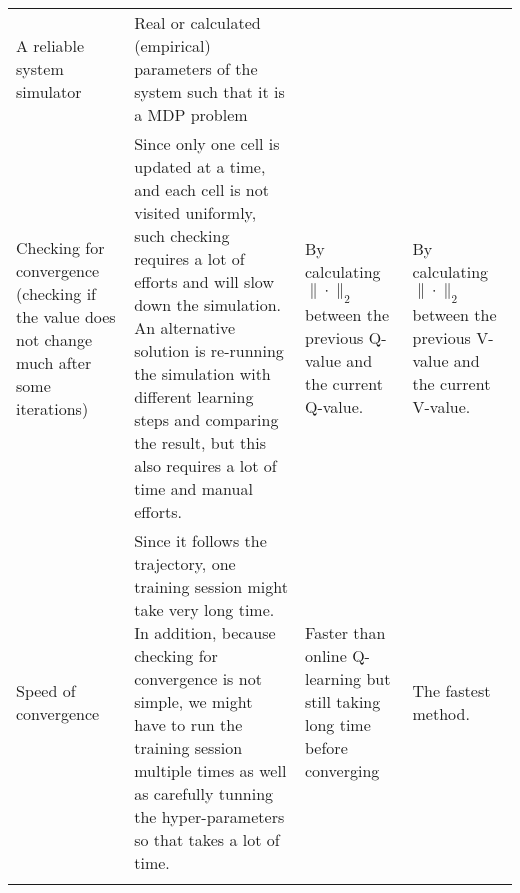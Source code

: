 \documentclass[
  a4paper, xcolor = usenames,dvipsnames]{article}
\theoremstyle{definition}
\theoremstyle{definition}
\theoremstyle{definition}
\theoremstyle{definition}
\theoremstyle{remark}
\begin{document}
\begin{longtable}[]{@{}llll@{}}
\begin{minipage}[t]{0.18\columnwidth}
A reliable system simulator\strut
\end{minipage} & \begin{minipage}[t]{0.18\columnwidth}\raggedright
Real or calculated (empirical) parameters of the system such that it is a MDP problem\strut
\end{minipage}\tabularnewline
\begin{minipage}[t]{0.18\columnwidth}\raggedright
Checking for convergence (checking if the value does not change much after some iterations)\strut
\end{minipage} & \begin{minipage}[t]{0.35\columnwidth}\raggedright
Since only one cell is updated at a time, and each cell is not visited uniformly, such checking requires a lot of efforts and will slow down the simulation. An alternative solution is re-running the simulation with different learning steps and comparing the result, but this also requires a lot of time and manual efforts.\strut
\end{minipage} & \begin{minipage}[t]{0.18\columnwidth}\raggedright
By calculating \(\| \cdot \|_{2}\) between the previous Q-value and the current Q-value.\strut
\end{minipage} & \begin{minipage}[t]{0.18\columnwidth}\raggedright
By calculating \(\| \cdot \|_{2}\) between the previous V-value and the current V-value.\strut
\end{minipage}\tabularnewline
\begin{minipage}[t]{0.18\columnwidth}\raggedright
Speed of convergence\strut
\end{minipage} & \begin{minipage}[t]{0.35\columnwidth}\raggedright
Since it follows the trajectory, one training session might take very long time. In addition, because checking for convergence is not simple, we might have to run the training session multiple times as well as carefully tunning the hyper-parameters so that takes a lot of time.\strut
\end{minipage} & \begin{minipage}[t]{0.18\columnwidth}\raggedright
Faster than online Q-learning but still taking long time before converging\strut
\end{minipage} & \begin{minipage}[t]{0.18\columnwidth}\raggedright
The fastest method.\strut
\end{minipage}\tabularnewline
\begin{minipage}[t]{0.18\columnwidth}\raggedright

\end{minipage}
\end{longtable}
\end{document}

